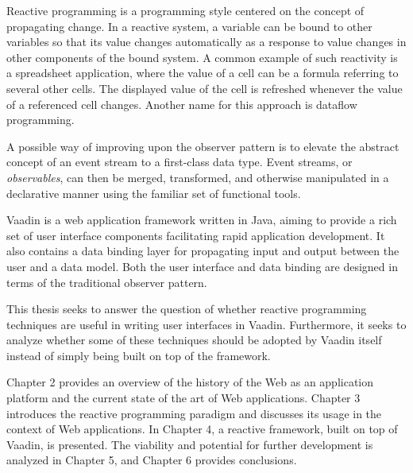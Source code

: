 Reactive programming is a programming style centered on the concept of propagating change. In a reactive system, a variable can be bound to other variables so that its value changes automatically as a response to value changes in other components of the bound system. A common example of such reactivity is a spreadsheet application, where the value of a cell can be a formula referring to several other cells. The displayed value of the cell is refreshed whenever the value of a referenced cell changes. Another name for this approach is dataflow programming.

A possible way of improving upon the observer pattern is to elevate the abstract concept of an event stream to a first-class data type. Event streams, or \emph{observables}, can then be merged, transformed, and otherwise manipulated in a declarative manner using the familiar set of functional tools.

Vaadin is a web application framework written in Java, aiming to provide a rich set of user interface components facilitating rapid application development. It also contains a data binding layer for propagating input and output between the user and a data model. Both the user interface and data binding are designed in terms of the traditional observer pattern. 

This thesis seeks to answer the question of whether reactive programming techniques are useful in writing user interfaces in Vaadin. Furthermore, it seeks to analyze whether some of these techniques should be adopted by Vaadin itself instead of simply being built on top of the framework.

Chapter 2 provides an overview of the history of the Web as an application platform and the current state of the art of Web applications. Chapter 3 introduces the reactive programming paradigm and discusses its usage in the context of Web applications. In Chapter 4, a reactive framework, built on top of Vaadin, is presented. The viability and potential for further development is analyzed in Chapter 5, and Chapter 6 provides conclusions.